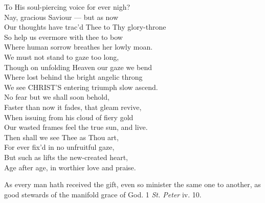  To His soul-piercing voice for ever nigh? \\
  Nay, gracious Saviour — but as now \\
 Our thoughts have trac’d Thee to Thy glory-throne \\
 So help us evermore with thee to bow \\
 Where human sorrow breathes her lowly moan. \\
  We must not stand to gaze too long, \\
 Though on unfolding Heaven our gaze we bend \\
 Where lost behind the bright angelic throng \\
 We see CHRIST’S entering triumph slow ascend. \\
  No fear but we shall soon behold, \\
 Faster than now it fades, that gleam revive, \\
 When issuing from his cloud of fiery gold \\
 Our wasted frames feel the true sun, and live. \\
  Then shall we see Thee as Thou art, \\
 For ever fix’d in no unfruitful gaze, \\
 But such as lifts the new-created heart, \\
 Age after age, in worthier love and praise.\\


As every man hath received the gift, even so minister the same one to another, as good stewards of the manifold grace of God. 1 \emph{St. Peter} iv. 10.


